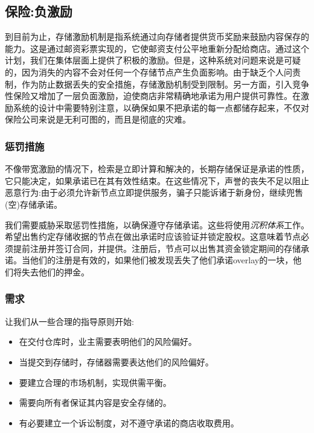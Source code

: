 \subsection{保险:负激励\statusorange}\label{sec:chunk-insurance}


到目前为止，存储激励机制是指系统通过向存储者提供货币奖励来鼓励内容保存的能力。这是通过邮资彩票实现的，它使邮资支付公平地重新分配给商店。通过这个计划，我们在集体层面上提供了积极的激励。但是，这种系统对问题来说是可疑的，因为消失的内容不会对任何一个存储节点产生负面影响。由于缺乏个人问责制，作为防止数据丢失的安全措施，存储激励机制受到限制。另一方面，引入竞争性保险又增加了一层负面激励，迫使商店非常精确地承诺为用户提供可靠性。在激励系统的设计中需要特别注意，以确保如果不把承诺的每一点都储存起来，不仅对保险公司来说是无利可图的，而且是彻底的灾难。 

\subsubsection{惩罚措施}

不像带宽激励的情况下，检索是立即计算和解决的，长期存储保证是承诺的性质，它只能决定，如果承诺已在其有效性结束。在这些情况下，声誉的丧失不足以阻止恶意行为:由于必须允许新节点立即提供服务，骗子只能诉诸于新身份，继续兜售(空)存储承诺。

我们需要威胁采取惩罚性措施，以确保遵守存储承诺。这些将使用\emph{沉积体系}工作。希望出售约定存储收据的节点在做出承诺时应该验证并锁定股权。这意味着节点必须提前注册并签订合同，并提供。注册后，节点可以出售其资金锁定期间的存储承诺。当他们的注册是有效的，如果他们被发现丢失了他们承诺overlay的一块，他们将失去他们的押金。

\subsubsection{需求}

让我们从一些合理的指导原则开始:

\begin{itemize}
\item 在交付仓库时，业主需要表明他们的风险偏好。
\item 当提交到存储时，存储器需要表达他们的风险偏好。
\item 要建立合理的市场机制，实现供需平衡。
\item 需要向所有者保证其内容是安全存储的。
\item 有必要建立一个诉讼制度，对不遵守承诺的商店收取费用。
\end{itemize}

